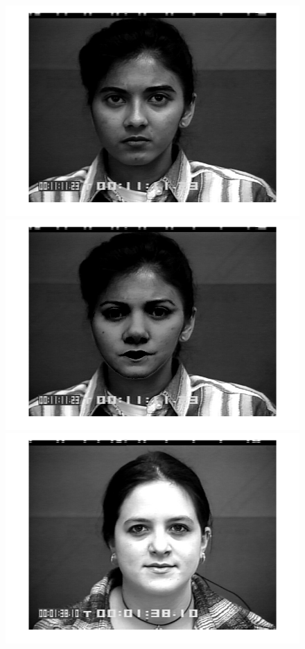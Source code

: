 	\begin{figure}[!htb]
    	\centering
    	\includegraphics[scale=.10]{figure/79/01.png}
    	\includegraphics[scale=.10]{figure/79de/01.png}
    	\hspace{1cm}
    	\includegraphics[scale=.10]{figure/72/02.png}

\end{figure}
